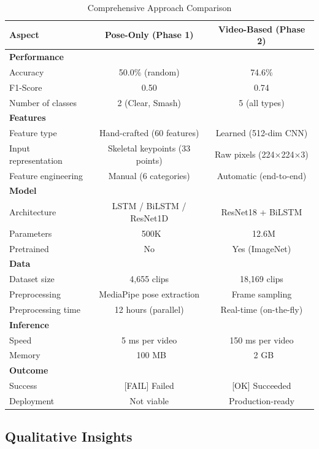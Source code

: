 \documentclass[11pt,a4paper]{article}
\begin{document}
\begin{table}[H]
\centering
\caption{Comprehensive Approach Comparison}
\begin{tabular}{lcc}
\toprule
Aspect & Pose-Only (Phase 1) & Video-Based (Phase 2) \\
\midrule
\textbf{Performance} & & \\
\quad Accuracy & 50.0\% (random) & 74.6\% \\
\quad F1-Score & 0.50 & 0.74 \\
\quad Number of classes & 2 (Clear, Smash) & 5 (all types) \\
\midrule
\textbf{Features} & & \\
\quad Feature type & Hand-crafted (60 features) & Learned (512-dim CNN) \\
\quad Input representation & Skeletal keypoints (33 points) & Raw pixels (224×224×3) \\
\quad Feature engineering & Manual (6 categories) & Automatic (end-to-end) \\
\midrule
\textbf{Model} & & \\
\quad Architecture & LSTM / BiLSTM / ResNet1D & ResNet18 + BiLSTM \\
\quad Parameters & ~500K & ~12.6M \\
\quad Pretrained & No & Yes (ImageNet) \\
\midrule
\textbf{Data} & & \\
\quad Dataset size & 4,655 clips & 18,169 clips \\
\quad Preprocessing & MediaPipe pose extraction & Frame sampling \\
\quad Preprocessing time & 12 hours (parallel) & Real-time (on-the-fly) \\
\midrule
\textbf{Inference} & & \\
\quad Speed & 5 ms per video & 150 ms per video \\
\quad Memory & ~100 MB & ~2 GB \\
\midrule
\textbf{Outcome} & & \\
\quad Success & [FAIL] Failed & [OK] Succeeded \\
\quad Deployment & Not viable & Production-ready \\
\bottomrule
\end{tabular}
\end{table}

\subsection{Qualitative Insights}
\end{document}
